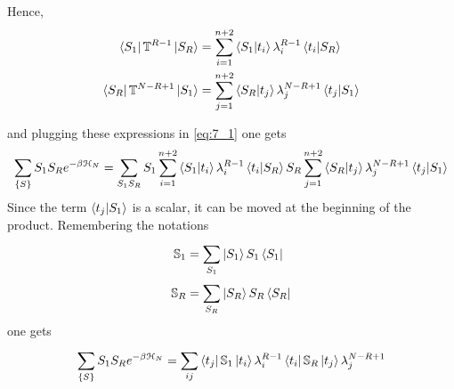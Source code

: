 \documentclass[../../Main/Main.tex]{subfiles}
\begin{document}
Hence,
\begin{align}
  \bra{S_1} \mathbb{T}^{R-1} \ket{S_R} & = \sum_{i=1}^{n+2} \braket{S_1}{t_i} \lambda_i ^{R-1} \braket{t_i}{S_R} \\
  \bra{S_R} \mathbb{T}^{N-R+1} \ket{S_1} & = \sum_{j=1}^{n+2} \braket{S_R}{t_j} \lambda_j ^{N-R+1} \braket{t_j}{S_1}   
\end{align}

and plugging these expressions in  \eqref{eq:7_1} one gets
\begin{equation*}
  \sum_{\{ S \}  }^{}  S_1 S_R e^{-\beta \mathcal{H}_N} = \sum_{S_1 S_R}^{} S_1 \sum_{i=1}^{n+2} \braket{S_1}{t_i} \lambda _i^{R-1} \braket{t_i}{S_R} S_R \sum_{j=1}^{n+2} \braket{S_R}{t_j} \lambda_j ^{N-R+1} \braket{t_j}{S_1}
\end{equation*}
Since the term \( \braket{t_j}{S_1}  \) is a scalar, it can be moved at the beginning of the product. Remembering the notations
\begin{align}
  \mathbb{S}_1 &= \sum_{S_1}^{} \ket{S_1} S_1 \bra{S_1} \\
  \mathbb{S}_R &= \sum_{S_R}^{} \ket{S_R} S_R \bra{S_R}
\end{align}
one gets
\begin{equation}
  \sum_{\{ S \}  }^{}  S_1 S_R e^{-\beta \mathcal{H}_N}= \sum_{ij}^{} \bra{t_j } \mathbb{S}_1 \ket{t_i} \lambda _i^{R-1} \bra{t_i} \mathbb{S}_R \ket{t_j} \lambda _j ^{N-R+1}
\end{equation}


\end{document}
